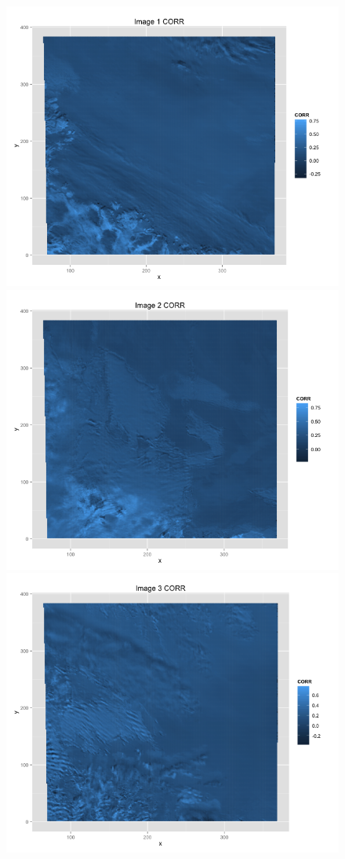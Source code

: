 \documentclass{article}\usepackage[]{graphicx}\usepackage[]{color}
\begin{document}
\begin{figure}
\includegraphics[scale = .35]{Image1CORR.png}
\includegraphics[scale = .35]{Image2CORR.png}
\includegraphics[scale = .35]{Image3CORR.png}

\end{figure}
\end{document}
